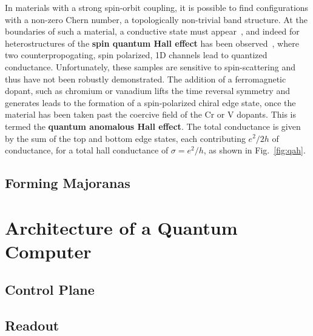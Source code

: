 In materials with a strong spin-orbit coupling, it is possible to find configurations with a non-zero Chern number, a topologically non-trivial band structure.
At the boundaries of such a material, a conductive state must appear~\cite{PhysRevLett.93.156804,PhysRevLett.92.126603}, and indeed for heterostructures of 
the \textbf{spin quantum Hall effect} has been observed~\cite{Konig766}, where two counterpropogating, spin polarized, 1D channels lead to quantized conductance. Unfortunately, these
samples are sensitive to spin-scattering and thus have not been robustly demonstrated. The addition of a ferromagnetic dopant, such as chromium or vanadium lifts the
time reversal symmetry and generates leads to the formation of a spin-polarized chiral edge state, once the material has been taken past the coercive field of the
Cr or V dopants. This is termed the \textbf{quantum anomalous Hall effect}. The total conductance is given by the sum of the top and bottom edge states,
each contributing $e^2/2h$ of conductance, for a total hall conductance of $\sigma = e^2/h$, as shown in Fig.~\ref{fig:qah}.

\subsection{Forming Majoranas}
\label{sec:makemajo}

\section{Architecture of a Quantum Computer}
\label{sec:arch}
  \subsection{Control Plane}
  \subsection{Readout}
  \label{sec:readout}